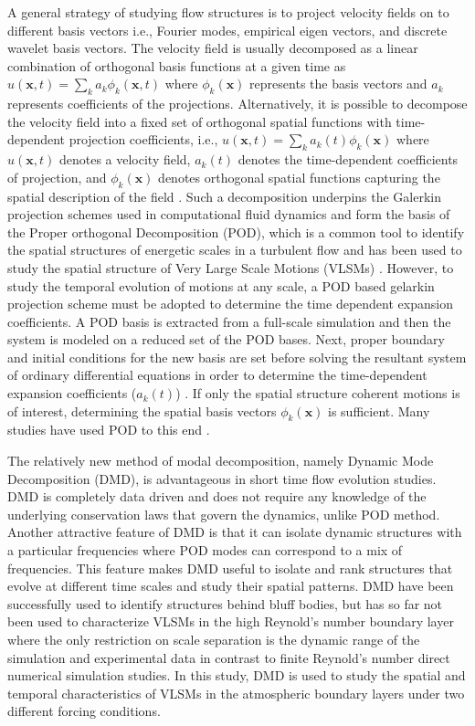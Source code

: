 A general strategy of studying flow structures is to project velocity fields on to different basis vectors i.e., Fourier modes, empirical eigen vectors, and discrete wavelet basis vectors. The velocity field is usually decomposed as a linear combination of orthogonal basis functions at a given time as $u(\mathbf{x},t) = \sum_k a_k \phi_k(\mathbf{x},t)$ where $\phi_k(\mathbf{x})$ represents the basis vectors and $a_k$ represents coefficients of the projections. Alternatively, it is possible to decompose the velocity field into a fixed set of orthogonal spatial functions with time-dependent projection coefficients,  i.e., $u(\mathbf{x},t)=\sum_k a_k(t) \phi_k(\mathbf{x})$  where $u(\mathbf{x},t)$ denotes a velocity field, $a_k(t)$ denotes the time-dependent  coefficients of projection, and $\phi_k(\mathbf{x})$ denotes orthogonal spatial functions capturing the spatial description of the field \citep{taira_arxiv_2017}. Such a decomposition underpins the Galerkin projection schemes used in computational fluid dynamics \citep{rowley2004model, armbruster_chaos_94} and form the basis of  the Proper orthogonal Decomposition (POD), which is a common tool to identify the spatial structures of energetic scales in a turbulent flow and has been used to study the spatial structure of Very Large Scale Motions (VLSMs) \citep[][]{Hellstrom_pof_2011,bailey_smits_jfm_2010}. However, to study the temporal evolution of motions at any scale, a POD based gelarkin projection scheme must be adopted to determine the time dependent expansion coefficients. A POD basis is extracted from a full-scale simulation and then the system is modeled on a reduced set of the POD bases. Next, proper boundary and initial conditions for the new basis are set before solving the resultant system of ordinary differential equations in order to determine the time-dependent expansion coefficients ($a_k(t)$) \citep[eg,. ][]{stabile2017advances}. If only the spatial structure coherent motions is of interest, determining the spatial basis vectors $\phi_k(\mathbf{x})$ is sufficient. Many studies have used POD to this end \citep[eg., ][]{li_bouzeid_blm_2011,muld_compFluids_2012}. 

The relatively new method of modal decomposition, namely Dynamic Mode Decomposition (DMD), is advantageous in short time flow evolution studies. DMD is completely data driven and does not require any knowledge of the underlying conservation laws that govern the dynamics, unlike POD method. Another attractive feature of DMD is that it can isolate dynamic structures with a particular frequencies where POD modes can correspond to a mix of frequencies. This feature makes DMD useful to isolate and rank structures that evolve at different time scales and study their spatial patterns. DMD have been successfully used to identify structures behind bluff bodies, but has so far not been used to characterize VLSMs in the high Reynold's number boundary layer where the only restriction on scale separation is the dynamic range of the simulation and experimental data in contrast to finite Reynold's number direct numerical simulation studies.  In this study, DMD is used to study the spatial and temporal characteristics of VLSMs in the atmospheric boundary layers under two different forcing conditions. 

